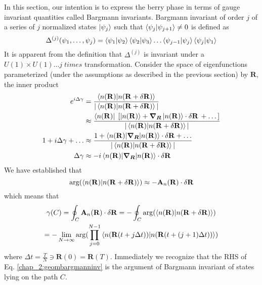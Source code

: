 In this section, our intention is to express the berry phase in terms of gauge invariant quantities called Bargmann invariants. 
Bargmann invariant of order $j$ of a series of $j$ normalized states $\ket{\psi_j}$ such that $\braket{\psi_j|\psi_{j+1}} \neq 0$ is defined as 
\begin{equation}
 \Delta^{(j)}(\psi_1, \dots, \psi_j) = \braket{\psi_1 | \psi_2}\braket{\psi_2|\psi_3}\dots\braket{\psi_{j-1}|\psi_j}\braket{\psi_j|\psi_1}
\end{equation} It is apparent from the definition that $\Delta^{(j)}$ is invariant under a $U(1) \times U(1) \dots j\;times$ transformation.
Consider the space of eigenfunctions parameterized (under the assumptions as 
described in the previous section) by $\mathbf{R}$, the inner product 
\begin{align}
e^{i\Delta\gamma} &= \frac{\braket{n(\mathbf{R})|n(\mathbf{R} +\delta\mathbf{R})}}{|\braket{n(\mathbf{R})|n(\mathbf{R} +\delta\mathbf{R})}|} \\
 		  &\approx \frac{\bra{n(\mathbf{R})}\;\lbrack \ket{n(\mathbf{R})} + \bm{\nabla_R}\ket{n(\mathbf{R})}\cdot \delta\mathbf{R}\, + \dots \rbrack}{|\braket{n(\mathbf{R})|n(\mathbf{R} +\delta\mathbf{R})}|} \nonumber \\
1 + i\Delta\gamma + \dots &\approx \frac{1 + \braket{n(\mathbf{R})|\bm{\nabla_R}|n(\mathbf{R})}\cdot \delta\mathbf{R} + \dots}{|\braket{n(\mathbf{R})|n(\mathbf{R} +\delta\mathbf{R})}|} \nonumber \\
\Delta\gamma	   &\approx  -i\braket{n(\mathbf{R})|\bm{\nabla_R}|n(\mathbf{R})}\cdot \delta\mathbf{R}
\end{align}
We have established that 
\begin{equation*}
 \arg(\braket{n(\mathbf{R})|n(\mathbf{R} +\delta\mathbf{R})}) \approx -\mathbf{A}_{n}(\mathbf{R}) \cdot \delta\mathbf{R}
\end{equation*} which means that
\begin{multline}
 \label{chap_2:geombargmanninv}\gamma(C) = \oint_{C}{\mathbf{A}_{n}(\mathbf{R}) \cdot \delta\mathbf{R}}  = -\oint_{C}{\arg(\braket{n(\mathbf{R})|n(\mathbf{R} +\delta\mathbf{R})})} \\ = -\lim_{N\rightarrow\infty} \arg(\prod_{j=0}^{N-1}{\braket{n(\mathbf{R}(t + j\Delta t))|n(\mathbf{R}(t + (j+1)\Delta t))}})
\end{multline} where $\Delta t = \frac{T}{N} \ni \mathbf{R}(0)=\mathbf{R}(T)$.
Immediately we recognize that the RHS of Eq. \eqref{chap_2:geombargmanninv} is the argument of Bargmann invariant of states lying on the path $C$.

